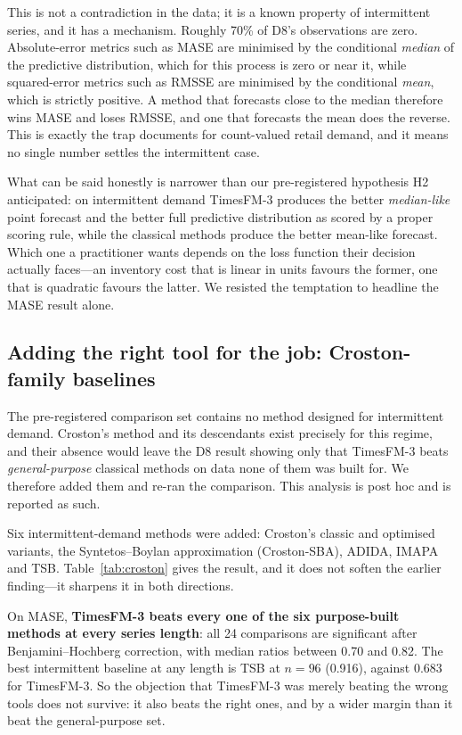 \documentclass[article]{ajs}
\providecommand{\tableref}[1]{Table~\ref{#1}}
\begin{document}


This is not a contradiction in the data; it is a known property of intermittent series, and it
has a mechanism. Roughly 70\% of D8's observations are zero. Absolute-error metrics such as MASE
are minimised by the conditional \emph{median} of the predictive distribution, which for this
process is zero or near it, while squared-error metrics such as RMSSE are minimised by the
conditional \emph{mean}, which is strictly positive. A method that forecasts close to the median
therefore wins MASE and loses RMSSE, and one that forecasts the mean does the reverse. This is
exactly the trap \citet{kolassa2016count} documents for count-valued retail demand, and it means
no single number settles the intermittent case.

What can be said honestly is narrower than our pre-registered hypothesis H2 anticipated: on
intermittent demand TimesFM-3 produces the better \emph{median-like} point forecast and the
better full predictive distribution as scored by a proper scoring rule, while the classical
methods produce the better mean-like forecast. Which one a practitioner wants depends on the
loss function their decision actually faces---an inventory cost that is linear in units favours
the former, one that is quadratic favours the latter. We resisted the temptation to headline the
MASE result alone.

\subsection{Adding the right tool for the job: Croston-family baselines}

The pre-registered comparison set contains no method designed for intermittent demand. Croston's
method \citep{croston1972} and its descendants exist precisely for this regime, and their absence
would leave the D8 result showing only that TimesFM-3 beats \emph{general-purpose} classical
methods on data none of them was built for. We therefore added them and re-ran the comparison.
This analysis is post hoc and is reported as such.

Six intermittent-demand methods were added: Croston's classic and optimised variants, the
Syntetos--Boylan approximation (Croston-SBA), ADIDA, IMAPA and TSB. \tableref{tab:croston} gives
the result, and it does not soften the earlier finding---it sharpens it in both directions.



On MASE, \textbf{TimesFM-3 beats every one of the six purpose-built methods at every series
length}: all 24 comparisons are significant after Benjamini--Hochberg correction, with median
ratios between 0.70 and 0.82. The best intermittent baseline at any length is TSB at $n = 96$
(0.916), against 0.683 for TimesFM-3. So the objection that TimesFM-3 was merely beating the
wrong tools does not survive: it also beats the right ones, and by a wider margin than it beat
the general-purpose set.
\end{document}
